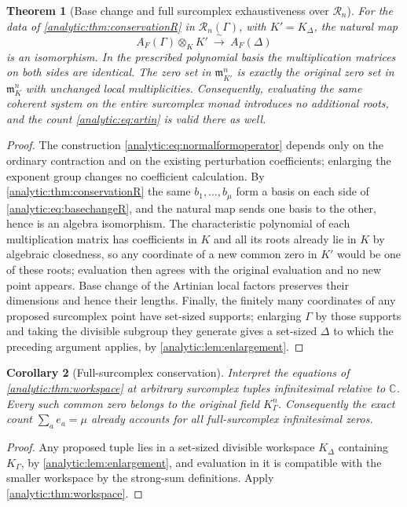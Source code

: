 \documentclass[11pt,letterpaper]{article}
\newtheorem{theorem}{Theorem}[section]
\newtheorem{corollary}[theorem]{Corollary}
\theoremstyle{definition}
\theoremstyle{remark}
\newcommand{\C}{\mathbb C}
\newcommand{\RR}{\mathscr R}
\newcommand{\m}{\mathfrak m}
\numberwithin{equation}{section}
\begin{document}
\begin{theorem}[Base change and full surcomplex exhaustiveness over $\RR_n$]
\label{analytic:thm:basechange}
For the data of \cref{analytic:thm:conservationR} in $\RR_n(\Gamma)$, with
$K'=K_\Delta$, the natural map
\begin{equation}\label{analytic:eq:basechangeR}
 A_F(\Gamma)\otimes_KK'\ \xrightarrow{\ \sim\ }\ A_F(\Delta)
\end{equation}
is an isomorphism. In the prescribed polynomial basis the multiplication
matrices on both sides are \emph{identical}. The zero set in $\m_{K'}^n$ is
exactly the original zero set in $\m_K^n$ with unchanged local
multiplicities. Consequently, evaluating the same coherent system on the
entire surcomplex monad introduces no additional roots, and the count
\eqref{analytic:eq:artin} is valid there as well.
\end{theorem}
\begin{proof}
The construction \eqref{analytic:eq:normalformoperator} depends only on the
ordinary contraction and on the existing perturbation coefficients;
enlarging the exponent group changes no coefficient calculation. By
\cref{analytic:thm:conservationR} the same $b_1,\ldots,b_\mu$ form a basis
on each side of \eqref{analytic:eq:basechangeR}, and the natural map sends
one basis to the other, hence is an algebra isomorphism. The characteristic
polynomial of each multiplication matrix has coefficients in $K$ and all its
roots already lie in $K$ by algebraic closedness, so any coordinate of a
new common zero in $K'$ would be one of these roots; evaluation then agrees
with the original evaluation and no new point appears. Base change of the
Artinian local factors preserves their dimensions and hence their lengths.
Finally, the finitely many coordinates of any proposed surcomplex point have
set-sized supports; enlarging $\Gamma$ by those supports and taking the
divisible subgroup they generate gives a set-sized $\Delta$ to which the
preceding argument applies, by \cref{analytic:lem:enlargement}.
\end{proof}

\begin{corollary}[Full-surcomplex conservation]
\label{analytic:cor:full-sc}
Interpret the equations of \cref{analytic:thm:workspace} at arbitrary
surcomplex tuples infinitesimal relative to $\C$. Every such common zero
belongs to the original field $K_\Gamma^n$. Consequently the exact count
$\sum_ae_a=\mu$ already accounts for \emph{all} full-surcomplex
infinitesimal zeros.
\end{corollary}
\begin{proof}
Any proposed tuple lies in a set-sized divisible workspace $K_\Delta$
containing $K_\Gamma$, by \cref{analytic:lem:enlargement}, and evaluation in
it is compatible with the smaller workspace by the strong-sum definitions.
Apply \cref{analytic:thm:workspace}.
\end{proof}
\end{document}
